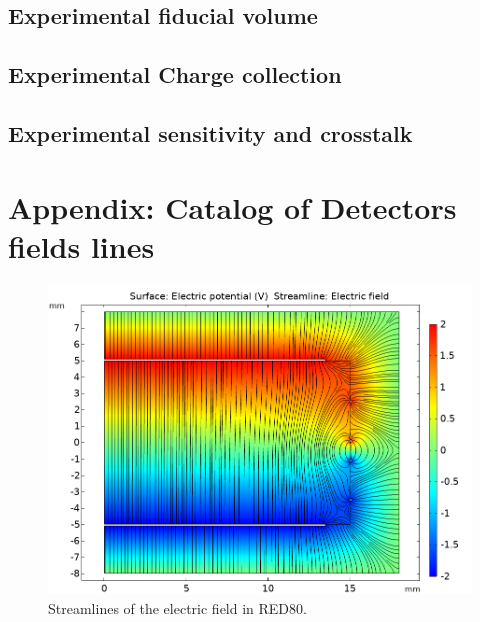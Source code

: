 \subsection{Experimental fiducial volume}

\subsection{Experimental Charge collection}

\subsection{Experimental sensitivity and crosstalk}


\section{Appendix: Catalog of Detectors fields lines}

\begin{figure}
\centering
\includegraphics[width=\linewidth]{Figures/Electrodes/streamlines_red80.png}
\caption{Streamlines of the electric field in RED80.}
\label{fig:streamlines-red80}
\end{figure}
